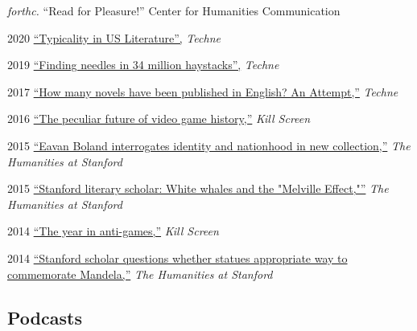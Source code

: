 \documentclass[12pt,letterpaper]{report}
\begin{document}
\begin{tablist}
	\item[\emph{forthc.}] \tab{}\enquote{Read for Pleasure!} Center for Humanities Communication
	\item[2020] \tab{}\href{https://web.archive.org/web/20220430165427/https://litlab.stanford.edu/typicality-in-the-u-s-novel/}{\enquote{Typicality in US Literature},} \emph{Techne}
	\item[2019] \tab{}\href{https://web.archive.org/web/20220430054802/https://litlab.stanford.edu/finding-needles-in-34-million-haystacks/}{\enquote{Finding needles in 34 million haystacks},} \emph{Techne}
	\item[2017] \tab{}\href{https://web.archive.org/web/20220323072937/https://litlab.stanford.edu/how-many-novels-have-been-published-in-english-an-attempt/}{\enquote{How many novels have been published in English? An Attempt,}} \emph{Techne}
	\item[2016] \tab{}\href{https://web.archive.org/web/20230328175329/https://killscreen.com/previously/articles/the-peculiar-future-of-videogame-history/}{\enquote{The peculiar future of video game history,}} \emph{Kill Screen}
	\item[2015] \tab{}\href{https://web.archive.org/web/20210810123746/https://news.stanford.edu/news/2015/february/boland-country-book-022615.html}{\enquote{Eavan Boland interrogates identity and nationhood in new collection,}} \emph{The Humanities at Stanford}
	\item[2015] \tab{}\href{https://web.archive.org/web/20210810125202/https://news.stanford.edu/news/2015/may/melville-scholar-boone-051115.html}{\enquote{Stanford literary scholar: White whales and the "Melville Effect,"}} \emph{The Humanities at Stanford}
	\item[2014] \tab{} \href{https://web.archive.org/web/20231028015401/https://killscreen.com/previously/articles/year-anti-games/}{\enquote{The year in anti-games,}}
	\emph{Kill Screen}
	\item[2014] \tab{}\href{https://web.archive.org/web/20220611230152/https://news.stanford.edu/pr/2014/pr-mandela-statue-parker-120314.html}{\enquote{Stanford scholar questions whether statues appropriate way to commemorate Mandela,}} \emph{The Humanities at Stanford}
\end{tablist}

\subsection*{Podcasts}
\end{document}
